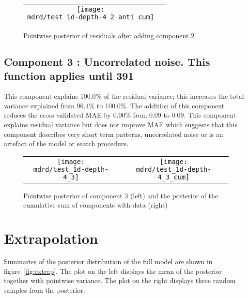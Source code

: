 \documentclass{article} %
\begin{document}
\begin{figure}[H]
\newcommand{\wmgd}{0.5\columnwidth}
\newcommand{\hmgd}{3.0cm}
\newcommand{\mdrd}{test_1d-depth-4}
\newcommand{\mbm}{\hspace{-0.3cm}}
\begin{tabular}{cc}
\mbm \texttt{[image: \\mdrd/test\_1d-depth-4\_2\_anti\_cum]}
\end{tabular}
\caption{Pointwise posterior of residuals after adding component 2}
\label{fig:comp2}
\end{figure}

\subsection{Component 3 : Uncorrelated noise. This function applies until  391}



This component explains 100.0\% of the residual variance; this increases the total variance explained from 96.4\% to 100.0\%.
The addition of this component reduces the cross validated MAE by 0.00\% from 0.09 to 0.09.
This component explains residual variance but does not improve MAE which suggests that this component describes very short term patterns, uncorrelated noise or is an artefact of the model or search procedure.

\begin{figure}[H]
\newcommand{\wmgd}{0.5\columnwidth}
\newcommand{\hmgd}{3.0cm}
\newcommand{\mdrd}{test_1d-depth-4}
\newcommand{\mbm}{\hspace{-0.3cm}}
\begin{tabular}{cc}
\mbm \texttt{[image: \\mdrd/test\_1d-depth-4\_3]} & \texttt{[image: \\mdrd/test\_1d-depth-4\_3\_cum]}
\end{tabular}
\caption{Pointwise posterior of component 3 (left) and the posterior of the cumulative sum of components with data (right)}
\label{fig:comp3}
\end{figure}

\section{Extrapolation}
\label{sec:extrap}

Summaries of the posterior distribution of the full model are shown in figure~\ref{fig:extrap}.
The plot on the left displays the mean of the posterior together with pointwise variance.
The plot on the right displays three random samples from the posterior.
\end{document}
